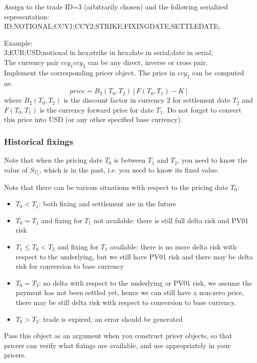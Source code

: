 \documentclass[10pt]{article}
\begin{document}
Assign to the trade ID=3 (arbitrarily chosen) and the following serialized representation:\\
ID;NOTIONAL;CCY1;CCY2;STRIKE;FIXINGDATE;SETTLEDATE;

\noindent Example:\\
3;EUR;USD;notional in hex;strike in hex;date in serial;date in serial;\\

The currency pair $ccy_1ccy_2$ can be any direct, inverse or cross pair.\\

Implement the corresponding pricer object. The price in $ccy_2$ can be computed as:
$$
price=B_2(T_0, T_2)[F(T_0,T_1)-K]
$$
where $B_2(T_0,T_2)$ is the discount factor in currency 2 for settlement date $T_2$ and $F(T_0,T_1)$ is the currency forward price for date $T_1$. Do not forget to convert this price into USD (or any other specified base currency).

\subsubsection{Historical fixings}
Note that when the pricing date $T_0$ is between $T_1$ and $T_2$, you need to know the value of $S_{T_1}$, which is in the past, i.e. you need to know its fixed value. 

Note that there can be various situations with respect to the pricing date $T_0$:
\begin{itemize}
	\item $T_0< T_1$: both fixing and settlement are in the future
	\item $T_0 = T_1$ and fixing for $T_1$ not available: there is still full delta risk and PV01 risk
	\item $ T_1 \leq T_0 < T_2$ and fixing for $T_1$ available: there is no more delta risk with respect to the underlying, but we still have PV01 risk and there may be delta risk for conversion to base currency
	\item $T_0 = T_2$: no delta with respect to the underlying or PV01 risk, we assume the payment has not been settled yet, hence we can still have a non-zero price, there may be still delta risk with respect to conversion to base currency.
	\item $T_0 > T_2$: trade is expired, an error should be generated
\end{itemize}

Pass this object as an argument when you construct pricer objects, so that pricers can verify what fixings are available, and use appropriately in your pricers.
\end{document}
